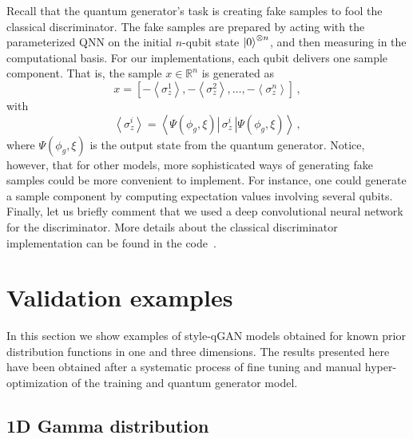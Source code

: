 \documentclass[twocolumn,preprintnumbers,superscriptaddress]{revtex4-2}
\begin{document}
Recall that the quantum generator's task is creating fake samples to fool the classical discriminator. The fake samples are prepared by acting with the parameterized QNN on the initial $n$-qubit state $\ket{0}^{\otimes n}$, and then measuring in the computational basis. For our implementations, each qubit delivers one sample component. That is, the sample $x \in \mathbb{R}^n$ is generated as
\begin{equation}
    \label{eq:samples} x = \left[-\left\langle\sigma_z^1\right\rangle,-\left\langle\sigma_z^2\right\rangle,\hdots,-\left\langle\sigma_z^n\right\rangle\right]\,,
\end{equation}
with
\begin{equation}
    \label{eq:expectation}\left\langle\sigma_z^i\right\rangle = \left\langle\Psi(\phi_g,\xi)\left|\,\sigma_z^i\,\right|\Psi(\phi_g,\xi)\right\rangle \,,
\end{equation}
where $\Psi(\phi_g,\xi)$ is the output state from the quantum generator. Notice, however, that for other models, more sophisticated ways of generating fake samples could be more convenient to implement. For instance, one could generate a sample component by computing expectation values involving several qubits. Finally, let us briefly comment that we used a deep convolutional neural network for the discriminator. More details about the classical discriminator implementation can be found in the code~\cite{cite_code}.

\section{Validation examples}
\label{sec:validation}

In this section we show examples of style-qGAN models obtained for known prior
distribution functions in one and three dimensions. The results presented here
have been obtained after a systematic process of fine tuning and manual
hyper-optimization of the training and quantum generator model.

\subsection{1D Gamma distribution}
\label{sec:gamma}
\end{document}
